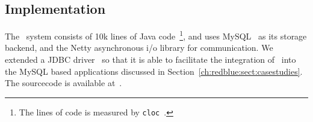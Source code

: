 \subsection{Implementation}
The \gemini\ system consists of 10k lines of Java code~\footnote{The lines of code is
measured by {\tt cloc}~\cite{codecounter}.}, and uses
MySQL~\cite{MySQL} as its storage backend, and 
the Netty asynchronous i/o library\cite{Netty} for communication.  We
extended a JDBC driver~\cite{JdbcDriver} so that it is able to facilitate the integration of
\gemini\ into the MySQL based applications discussed in
Section~\ref{ch:redblue:sect:casestudies}. The sourcecode is available at~\cite{GeminiSource}.


 
